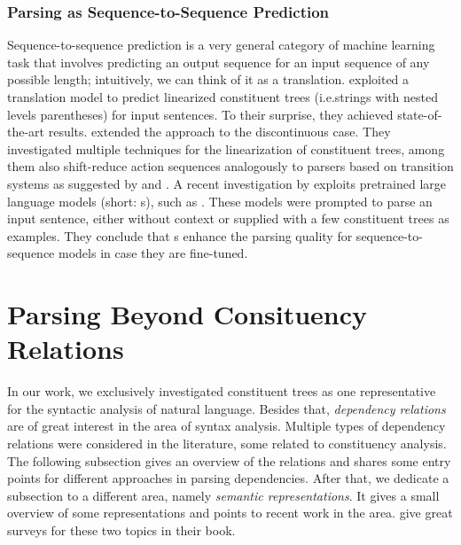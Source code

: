\documentclass[../document.tex]{subfiles}
\begin{document}
    \subsubsection*{Parsing as Sequence-to-Sequence Prediction}
    Sequence-to-sequence prediction is a very general category of machine learning task that involves predicting an output sequence for an input sequence of any possible length; intuitively, we can think of it as a translation.
     exploited a translation model to predict linearized constituent trees (i.e.\@ strings with nested levels parentheses) for input sentences.
    To their surprise, they achieved state-of-the-art results.
     extended the approach to the discontinuous case.
    They investigated multiple techniques for the linearization of constituent trees, among them also shift-reduce action sequences analogously to parsers based on transition systems as suggested by \citet{Ma2017DeterministicAF} and \citet{liu-zhang-2017-encoder}.
    A recent investigation by \citet{bai2023constituency} exploits pretrained large language models (short: s), such as  \citep{openai2023gpt4}.
    These models were prompted to parse an input sentence, either without context or supplied with a few constituent trees as examples.
    They conclude that s enhance the parsing quality for sequence-to-sequence models in case they are fine-tuned.

    \section{Parsing Beyond Consituency Relations}\label{sec:literature:beyond}
    In our work, we exclusively investigated constituent trees as one representative for the syntactic analysis of natural language.
    Besides that, \emph{dependency relations} are of great interest in the area of syntax analysis.
    Multiple types of dependency relations were considered in the literature, some related to constituency analysis.
    The following subsection gives an overview of the relations and shares some entry points for different approaches in parsing dependencies.
    After that, we dedicate a subsection to a different area, namely \emph{semantic representations}.
    It gives a small overview of some representations and points to recent work in the area.
     give great surveys for these two topics in their book.
\end{document}
